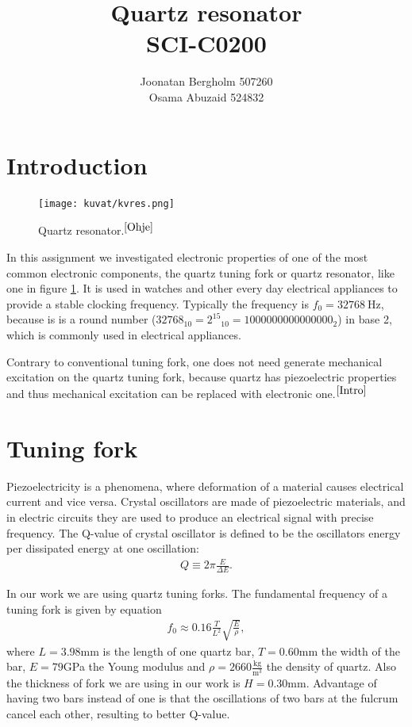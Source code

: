 \documentclass[12pt]{article}
\title{\textbf{Quartz resonator} \\ SCI-C0200}
\author{Joonatan Bergholm 507260 \\ Osama Abuzaid 524832}
\begin{document}
\maketitle
\newpage


\tableofcontents
\newpage

\section{Introduction}

\begin{figure}
	\centering
	\texttt{[image: kuvat/kvres.png]}
	\caption{Quartz resonator.$^{\cite{Ohje}}$}
	\label{fig:kvres}
\end{figure}

In this assignment we investigated electronic properties of one of the most common electronic components, the quartz tuning fork or quartz resonator, like one in figure \ref{fig:kvres}. It is used in watches and other every day electrical appliances to provide a stable clocking frequency. Typically the frequency is $f_0 = \SI{32768}{\hertz}$, because is is a round number ($32768_{10} = {2^{15}}_{10} = 1000000000000000_2$) in base 2, which is commonly used in electrical appliances.

Contrary to conventional tuning fork, one does not need generate mechanical excitation
on the quartz tuning fork, because quartz has piezoelectric properties and thus mechanical excitation can be replaced with electronic one.$^{\cite{Intro}}$

\section{Tuning fork}
Piezoelectricity is a phenomena, where deformation of a material causes electrical current and vice versa. Crystal oscillators are made of piezoelectric materials, and in electric circuits they are used to produce an electrical signal with precise frequency. The Q-value of crystal oscillator is defined to be the oscillators energy per dissipated energy at one oscillation:
\begin{align}
Q \equiv 2\pi\frac{E}{\Delta E}.
\end{align}

In our work we are using quartz tuning forks. The fundamental frequency of a tuning fork is given by equation
\begin{align}
f_0 \approx 0.16\frac{T}{L^2}\sqrt{\frac{E}{\rho}},
\end{align}
where $L = 3.98 $mm is the length of one quartz bar, $T = 0.60 $mm the width of the bar, $E = 79 $GPa the Young modulus and $\rho = 2660\frac{\mathrm{kg}}{\mathrm{m}^3}$ the density of quartz. Also the thickness of fork we are using in our work is $H = 0.30$mm. Advantage of having two bars instead of one is that the oscillations of two bars at the fulcrum cancel each other, resulting to better Q-value.
\end{document}
